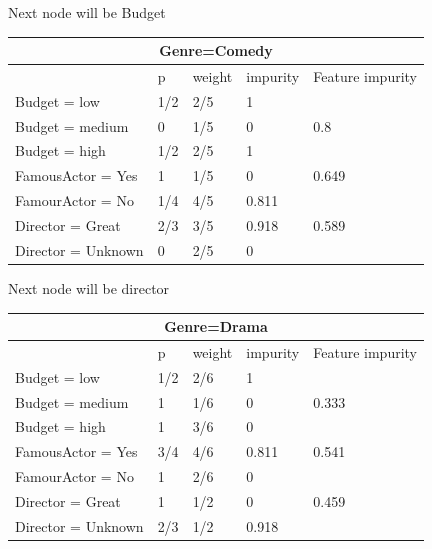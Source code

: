 \documentclass[letter]{article}
\theoremstyle{case}
\begin{document}
Next node will be Budget
\newpage
\begin{table}[!h]
\begin{tabular}{|l|l|l|l|l|}
\hline
\multicolumn{5}{|c|}{Genre=Comedy}                              \\ \hline
                   & p   & weight & impurity & Feature impurity \\ \hline
Budget = low       & 1/2 & 2/5    & 1        &                  \\ \cline{1-4}
Budget = medium    & 0   & 1/5    & 0        & 0.8              \\ \cline{1-4}
Budget = high      & 1/2 & 2/5    & 1        &                  \\ \hline
FamousActor = Yes  & 1   & 1/5    & 0        & 0.649            \\ \cline{1-4}
FamourActor = No   & 1/4 & 4/5    & 0.811    &                  \\ \hline
Director = Great   & 2/3 & 3/5    & 0.918    & 0.589            \\ \cline{1-4}
Director = Unknown & 0   & 2/5    & 0        &                  \\ \hline
\end{tabular}
\end{table} 
Next node will be director \\
\begin{table}[!h]
\begin{tabular}{|l|l|l|l|l|}
\hline
\multicolumn{5}{|c|}{Genre=Drama}                              \\ \hline
                   & p   & weight & impurity & Feature impurity \\ \hline
Budget = low       & 1/2 & 2/6    & 1        &                  \\ \cline{1-4}
Budget = medium    & 1   & 1/6    & 0        & 0.333            \\ \cline{1-4}
Budget = high      & 1   & 3/6    & 0        &                  \\ \hline
FamousActor = Yes  & 3/4 & 4/6    & 0.811    & 0.541            \\ \cline{1-4}
FamourActor = No   & 1   & 2/6    & 0        &                  \\ \hline
Director = Great   & 1   & 1/2    & 0        & 0.459            \\ \cline{1-4}
Director = Unknown & 2/3 & 1/2    & 0.918    &                  \\ \hline
\end{tabular}
\end{table} \\
\end{document}
